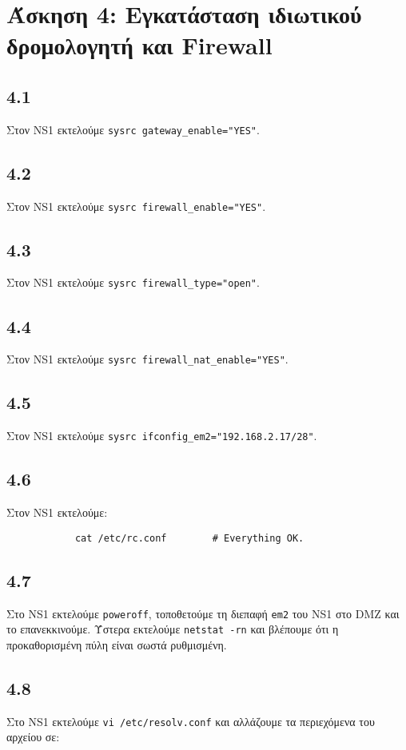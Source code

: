 \documentclass[a4paper, 12pt]{article}
\begin{document}
\section*{Άσκηση 4: Εγκατάσταση ιδιωτικού δρομολογητή και Firewall}

	\subsection*{4.1}
		Στον NS1 εκτελούμε \verb|sysrc gateway_enable="YES"|.

	\subsection*{4.2}
		Στον NS1 εκτελούμε \verb|sysrc firewall_enable="YES"|.

	\subsection*{4.3}
		Στον NS1 εκτελούμε \verb|sysrc firewall_type="open"|.

	\subsection*{4.4}
		Στον NS1 εκτελούμε \verb|sysrc firewall_nat_enable="YES"|.

	\subsection*{4.5}
		Στον NS1 εκτελούμε \verb|sysrc ifconfig_em2="192.168.2.17/28"|.

	\subsection*{4.6}
		Στον NS1 εκτελούμε:
		
		\begin{verbatim}
			cat /etc/rc.conf        # Everything OK.
		\end{verbatim}

	\subsection*{4.7}
		Στο NS1 εκτελούμε \verb|poweroff|, τοποθετούμε τη διεπαφή \verb|em2| του NS1 στο DMZ και το επανεκκινούμε. Ύστερα εκτελούμε \verb|netstat -rn| και βλέπουμε ότι η προκαθορισμένη πύλη είναι σωστά ρυθμισμένη. 
		
	\subsection*{4.8} 
		Στο NS1 εκτελούμε \verb|vi /etc/resolv.conf| και αλλάζουμε τα περιεχόμενα του αρχείου σε:
		
\end{document}
